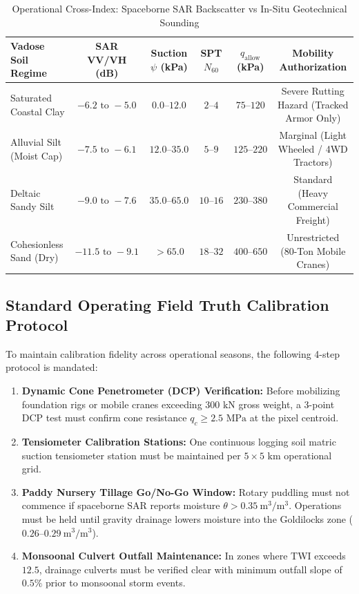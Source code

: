 \documentclass[11pt,a4paper]{article}
\theoremstyle{definition}
\theoremstyle{remark}
\begin{document}
\begin{table}[htbp]
\centering
\small
\caption{Operational Cross-Index: Spaceborne SAR Backscatter vs In-Situ Geotechnical Sounding}
\begin{tabular}{lccccc}
\toprule
\textbf{Vadose Soil Regime} & \textbf{SAR VV/VH (dB)} & \textbf{Suction $\psi$ (kPa)} & \textbf{SPT $N_{60}$} & \textbf{$q_{\text{allow}}$ (kPa)} & \textbf{Mobility Authorization} \\
\midrule
Saturated Coastal Clay & $-6.2 \text{ to } -5.0$ & $0.0 \text{--} 12.0$ & $2 \text{--} 4$ & $75 \text{--} 120$ & Severe Rutting Hazard (Tracked Armor Only) \\
Alluvial Silt (Moist Cap) & $-7.5 \text{ to } -6.1$ & $12.0 \text{--} 35.0$ & $5 \text{--} 9$ & $125 \text{--} 220$ & Marginal (Light Wheeled / 4WD Tractors) \\
Deltaic Sandy Silt & $-9.0 \text{ to } -7.6$ & $35.0 \text{--} 65.0$ & $10 \text{--} 16$ & $230 \text{--} 380$ & Standard (Heavy Commercial Freight) \\
Cohesionless Sand (Dry) & $-11.5 \text{ to } -9.1$ & $> 65.0$ & $18 \text{--} 32$ & $400 \text{--} 650$ & Unrestricted (80-Ton Mobile Cranes) \\
\bottomrule
\end{tabular}
\label{tab:field_cross_index}
\end{table}

\subsection{Standard Operating Field Truth Calibration Protocol}
To maintain calibration fidelity across operational seasons, the following 4-step protocol is mandated:
\begin{enumerate}
    \item \textbf{Dynamic Cone Penetrometer (DCP) Verification:} Before mobilizing foundation rigs or mobile cranes exceeding $300\text{ kN}$ gross weight, a 3-point DCP test must confirm cone resistance $q_c \ge 2.5\text{ MPa}$ at the pixel centroid.
    \item \textbf{Tensiometer Calibration Stations:} One continuous logging soil matric suction tensiometer station must be maintained per $5 \times 5\text{ km}$ operational grid.
    \item \textbf{Paddy Nursery Tillage Go/No-Go Window:} Rotary puddling must not commence if spaceborne SAR reports moisture $\theta > 0.35~\text{m}^3/\text{m}^3$. Operations must be held until gravity drainage lowers moisture into the Goldilocks zone ($0.26\text{--}0.29~\text{m}^3/\text{m}^3$).
    \item \textbf{Monsoonal Culvert Outfall Maintenance:} In zones where TWI exceeds $12.5$, drainage culverts must be verified clear with minimum outfall slope of $0.5\%$ prior to monsoonal storm events.
\end{enumerate}
\end{document}
